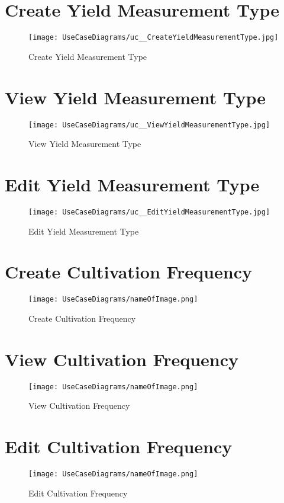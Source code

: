 \documentclass[11pt,fleqn]{book} %
\begin{document}
	\section{Create Yield Measurement Type}
	\begin{figure}
		\texttt{[image: UseCaseDiagrams/uc\_\_CreateYieldMeasurementType.jpg]}
		\caption{Create Yield Measurement Type}
	\end{figure}
	
	\section{View Yield Measurement Type}
	\begin{figure}
		\texttt{[image: UseCaseDiagrams/uc\_\_ViewYieldMeasurementType.jpg]}
		\caption{View Yield Measurement Type}
	\end{figure}
	
	\section{Edit Yield Measurement Type}
	\begin{figure}
		\texttt{[image: UseCaseDiagrams/uc\_\_EditYieldMeasurementType.jpg]}
		\caption{Edit Yield Measurement Type}
	\end{figure}
	
	\section{Create Cultivation Frequency}
	\begin{figure}
		\texttt{[image: UseCaseDiagrams/nameOfImage.png]}
		\caption{Create Cultivation Frequency}
	\end{figure}
	
	\section{View Cultivation Frequency}
	\begin{figure}
		\texttt{[image: UseCaseDiagrams/nameOfImage.png]}
		\caption{View Cultivation Frequency}
	\end{figure}
	
	\section{Edit Cultivation Frequency}
	\begin{figure}
		\texttt{[image: UseCaseDiagrams/nameOfImage.png]}
		\caption{Edit Cultivation Frequency}
	\end{figure}
	
\end{document}
